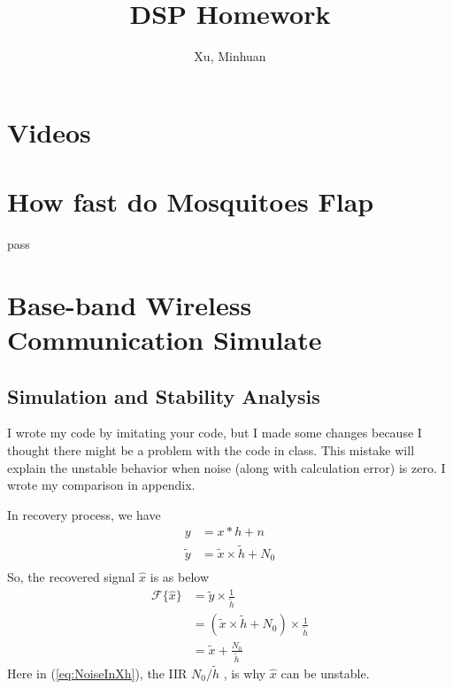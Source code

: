 \documentclass{article}
\begin{document}
\title{DSP Homework}
\author{Xu, Minhuan}
\maketitle
\tableofcontents
\begin{abstract}

\end{abstract}

\section{Videos}

\section{How fast do Mosquitoes Flap}
pass

\section{Base-band Wireless Communication Simulate}
\subsection{Simulation and Stability Analysis}
I wrote my code by imitating your code, but I made some changes because I thought there might be a problem with the code in class. This mistake will explain the unstable behavior when noise (along with calculation error) is zero. I wrote my comparison in appendix.

In recovery process, we have
\begin{equation}
	\begin{aligned}
		y &= x * h + n \\ 
		\tilde{y} &= \tilde{x} \times \tilde{h} + N_0 \\
	\end{aligned}
\end{equation}
So, the recovered signal $\hat{x}$ is as below
\begin{equation}
	\begin{aligned}
		\mathcal{F}\{\hat{x}\} &= \tilde{y} \times \frac{1}{\tilde{h}} \\  
		&= ( \tilde{x} \times \tilde{h} + N_0 ) \times \frac{1}{\tilde{h}} \\ 
		&= \tilde{x} + \frac{N_0}{\tilde{h}}
	\end{aligned}
	\label{eq:NoiseInXh}
\end{equation}
Here in (\ref{eq:NoiseInXh}), the IIR $N_0/\tilde{h}$ , is why $\hat{x}$ can be unstable.
\end{document}
